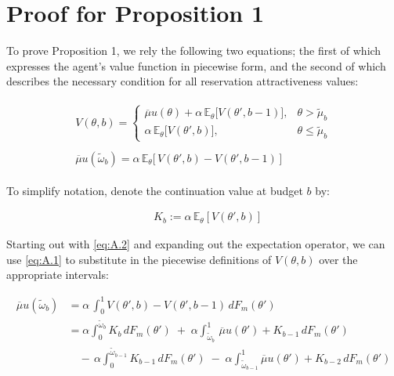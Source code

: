 \section{Proof for Proposition 1}
\label{appx: b} 
To prove Proposition 1, we rely the following two equations; the first of which expresses the agent's value function in piecewise form, and the second of which describes the necessary condition for all reservation attractiveness values:

\begin{align}
    \begin{split}\label{eq:A.1}
        V(\theta, b)=\begin{cases} 
            \overline\mu u(\theta) +\alpha \,\mathbb{E}_{\theta}\Big[V(\theta', b-1)\Big],& \theta> \widetilde \mu_b \\[10pt]
            \alpha \,\mathbb{E}_{\theta}\Big[V(\theta', b)\Big],& \theta\leq\widetilde \mu_b
        \end{cases}
    \end{split}\\[10pt]
    \begin{split}\label{eq:A.2}
        \overline\mu u(\widetilde\omega_b) = \alpha \, \mathbb{E}_\theta\Big[\,V(\theta',b)-V(\theta',b-1)\,\Big] 
    \end{split} 
\end{align} 
 
To simplify notation, denote the continuation value at budget $b$ by:

\begin{equation*}
    \begin{aligned}
        &K_{b}:=\alpha \,\mathbb{E}_{\theta}\left[V(\theta', b)\right] 
    \end{aligned} 
\end{equation*}

Starting out with \autoref{eq:A.2} and expanding out the expectation operator, we can use \ref{eq:A.1} to substitute in the piecewise definitions of $V(\theta,b)$ over the appropriate intervals:

\begin{equation}\label{eq:A.3}
    \begin{split}
        \overline\mu u(\widetilde\omega_b) &= \alpha \,\int^1_0 V(\theta',b)-V(\theta',b-1)\,dF_m(\theta')\\
                                           &=\alpha \int^{\widetilde\omega_b}_0 K_b\,dF_m(\theta') \;+\; \alpha \int^1_{\widetilde\omega_b}\,\overline\mu u(\theta') + K_{b-1}\,dF_m(\theta')\\ 
                                           & \quad -\,\alpha \int^{\widetilde\omega_{b-1}}_0 K_{b-1}\,dF_m(\theta') \;-\; \alpha \int^1_{\widetilde\omega_{b-1}} \overline\mu u(\theta') + K_{b-2}\,dF_m(\theta')
    \end{split}
\end{equation}


